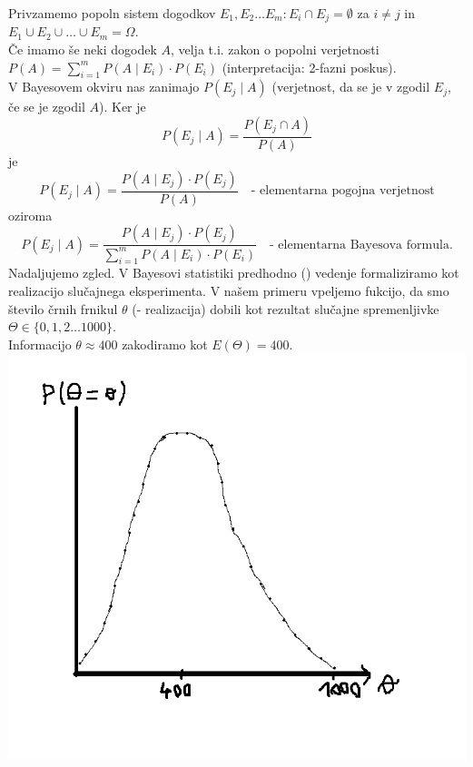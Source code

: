 \documentclass[a4paper, 12pt]{book}
\theoremstyle{definition}
\theoremstyle{remark}
\begin{document}
Privzamemo popoln sistem dogodkov $E_1, E_2 \dots E_m: E_i \cap E_j = \emptyset$ za $i \neq j$ in
$E_1 \cup E_2 \cup \dots \cup E_m = \Omega$. \\
Če imamo še neki dogodek $A$, velja t.i. zakon o popolni verjetnosti \\
$P(A) = \sum_{i=1}^{m} P(A \mid E_i) \cdot P(E_i)$ (interpretacija: 2-fazni poskus). \\
V Bayesovem okviru nas zanimajo $P(E_j \mid A)$ (verjetnost, da se je v  zgodil $E_j$,
če se je  zgodil $A$).
Ker je
\begin{equation*}
  P(E_j \mid A) = \frac{P(E_j \cap A)}{P(A)}
\end{equation*}
je
\begin{equation*}
  P(E_j \mid A) = \frac{P(A \mid E_j) \cdot P(E_j)}{P(A)} \quad \text{- elementarna pogojna verjetnost}
\end{equation*}
oziroma
\begin{equation*}
  P(E_j \mid A) = \frac{P(A \mid E_j) \cdot P(E_j)}{\sum_{i=1}^{m} P(A \mid E_i) \cdot P(E_i)}
    \quad \text{- elementarna Bayesova formula.}
\end{equation*}
Nadaljujemo zgled. V Bayesovi statistiki predhodno () vedenje formaliziramo kot realizacijo slučajnega eksperimenta.
V našem primeru vpeljemo fukcijo, da smo število črnih frnikul $\theta$ (- realizacija) dobili kot rezultat
slučajne spremenljivke $\Theta \in \{0, 1, 2 \dots 1000\}$. \\
Informacijo $\theta \approx 400$ zakodiramo kot $E(\Theta) = 400$. \\
\includegraphics[scale=0.4]{apriori_1_1} \\
\end{document}
